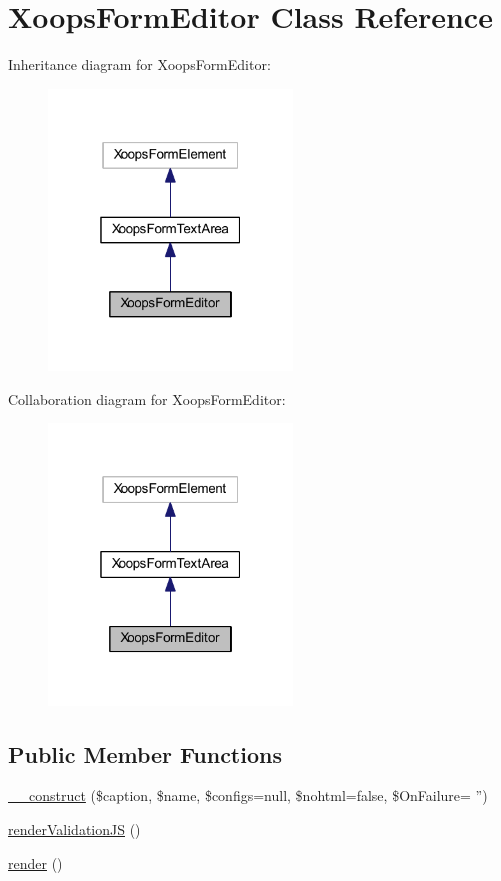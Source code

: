 \hypertarget{class_xoops_form_editor}{\section{Xoops\-Form\-Editor Class Reference}
\label{class_xoops_form_editor}
}


Inheritance diagram for Xoops\-Form\-Editor\-:
\nopagebreak
\begin{figure}[H]
\begin{center}
\leavevmode
\includegraphics[width=184pt]{class_xoops_form_editor__inherit__graph}
\end{center}
\end{figure}


Collaboration diagram for Xoops\-Form\-Editor\-:
\nopagebreak
\begin{figure}[H]
\begin{center}
\leavevmode
\includegraphics[width=184pt]{class_xoops_form_editor__coll__graph}
\end{center}
\end{figure}
\subsection*{Public Member Functions}
\begin{DoxyCompactItemize}
\item 
\hyperlink{class_xoops_form_editor_aeed189812b5f5ff43110a59d2c563f66}{\-\_\-\-\_\-construct} (\$caption, \$name, \$configs=null, \$nohtml=false, \$On\-Failure= '')
\item 
\hyperlink{class_xoops_form_editor_a2747262e7fc6aba84bfc52bcf38407df}{render\-Validation\-J\-S} ()
\item 
\hyperlink{class_xoops_form_editor_afde88292c44dc59faf017738dae6dffb}{render} ()
\end{DoxyCompactItemize}
